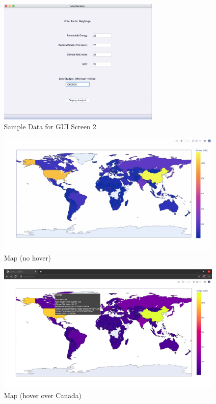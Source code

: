 \documentclass[fontsize=11pt]{article}
\begin{document}
    \begin{figure}[H]
        \centering
        \includegraphics[width=8cm]{Figure 7.jpeg}
        \caption{Sample Data for GUI Screen 2}
    \end{figure}
    \begin{figure}[H]
        \centering
        \includegraphics[width=14cm]{Figure 8.jpeg}
        \caption{Map (no hover)}
    \end{figure}
    \begin{figure}[H]
        \centering
        \includegraphics[width=14cm]{Figure 9.png}
        \caption{Map (hover over Canada)}
    \end{figure}
    
\end{document}
